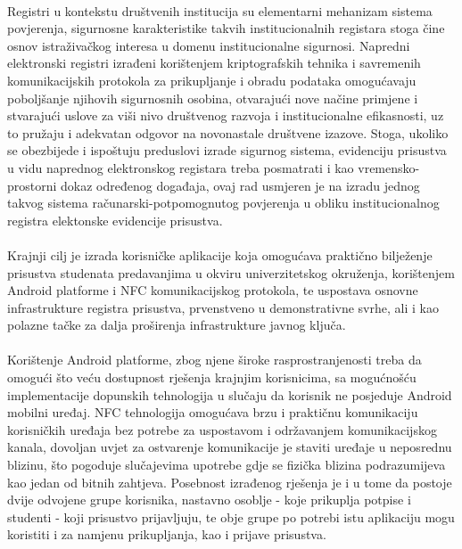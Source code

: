 \paragraph*{}
Registri u kontekstu društvenih institucija su elementarni mehanizam sistema povjerenja, sigurnosne karakteristike takvih institucionalnih registara stoga čine osnov istraživačkog interesa u domenu institucionalne sigurnosi. Napredni elektronski registri izrađeni korištenjem kriptografskih tehnika i savremenih komunikacijskih protokola za prikupljanje i obradu podataka omogućavaju poboljšanje njihovih sigurnosnih osobina, otvarajući nove načine primjene i stvarajući uslove za viši nivo društvenog razvoja i institucionalne efikasnosti, uz to pružaju i adekvatan odgovor na novonastale društvene izazove. Stoga, ukoliko se obezbijede i ispoštuju preduslovi izrade sigurnog sistema\cite{iso2013iso}, evidenciju prisustva u vidu naprednog elektronskog registara treba posmatrati i kao vremensko-prostorni dokaz određenog događaja, ovaj rad usmjeren je na izradu jednog takvog sistema računarski-potpomognutog povjerenja u obliku institucionalnog registra elektonske evidencije prisustva.

\paragraph*{}
Krajnji cilj je izrada korisničke aplikacije koja omogućava praktično bilježenje prisustva studenata predavanjima u okviru univerzitetskog okruženja, korištenjem Android platforme i NFC komunikacijskog protokola, te uspostava osnovne infrastrukture registra prisustva, prvenstveno u demonstrativne svrhe, ali i kao polazne tačke za dalja proširenja infrastrukture javnog ključa.

\paragraph*{}
Korištenje Android platforme, zbog njene široke rasprostranjenosti treba da omogući što veću dostupnost rješenja krajnjim korisnicima, sa mogućnošću implementacije dopunskih tehnologija u slučaju da korisnik ne posjeduje Android mobilni uređaj. NFC tehnologija omogućava brzu i praktičnu komunikaciju korisničkih uređaja bez potrebe za uspostavom i održavanjem komunikacijskog kanala, dovoljan uvjet za ostvarenje komunikacije je staviti uređaje u neposrednu blizinu, što pogoduje slučajevima upotrebe gdje se fizička blizina podrazumijeva kao jedan od bitnih zahtjeva. Posebnost izrađenog rješenja je i u tome da postoje dvije odvojene grupe korisnika, nastavno osoblje - koje prikuplja potpise i studenti - koji prisustvo prijavljuju, te obje grupe po potrebi istu aplikaciju mogu koristiti i za namjenu prikupljanja, kao i prijave prisustva.

